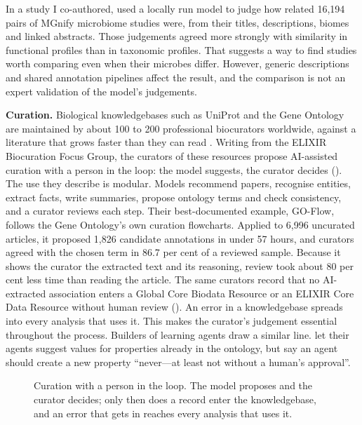 In a study I co-authored, \textcite{venetsianou2026relatedness} used a locally
run model to judge how related 16{,}194 pairs of MGnify microbiome studies were,
from their titles, descriptions, biomes and linked abstracts. Those judgements
agreed more strongly with similarity in functional profiles than in taxonomic
profiles. That suggests a way to find studies worth comparing even when their
microbes differ. However, generic descriptions and shared annotation pipelines
affect the result, and the comparison is not an expert validation of the
model's judgements.

\textbf{Curation.} Biological knowledgebases such as UniProt and the Gene
Ontology are maintained by about 100 to 200 professional biocurators
worldwide, against a literature that grows faster than they can read
\parencite{pombase2026curation}. Writing from the ELIXIR Biocuration Focus
Group, the curators of these resources propose AI-assisted curation with a
person in the loop: the model suggests, the curator decides
(). The use they describe is modular. Models recommend
papers, recognise entities, extract facts, write summaries, propose ontology
terms and check consistency, and a curator reviews each step. Their
best-documented example, GO-Flow, follows the Gene Ontology's own curation
flowcharts. Applied to 6,996 uncurated articles, it proposed 1,826 candidate
annotations in under 57 hours, and curators agreed with the chosen term in
86.7 per cent of a reviewed sample. Because it shows the curator the
extracted text and its reasoning, review took about 80 per cent less time
than reading the article. The same curators record that no AI-extracted
association enters a Global Core Biodata Resource or an ELIXIR Core Data
Resource without human review (). An error in a
knowledgebase spreads into every analysis that uses it. This makes the
curator's judgement essential throughout the process. Builders of learning
agents draw a similar line. \textcite{mcshane2024agents} let their agents
suggest values for properties already in the ontology, but say an agent should
create a new property ``never---at least not without a human's approval''.

\begin{figure}[htbp]
\centering
{}
\caption{Curation with a person in the loop. The model proposes and the curator
decides; only then does a record enter the knowledgebase, and an error that
gets in reaches every analysis that uses it.}
\label{fig:curation}
\end{figure}

